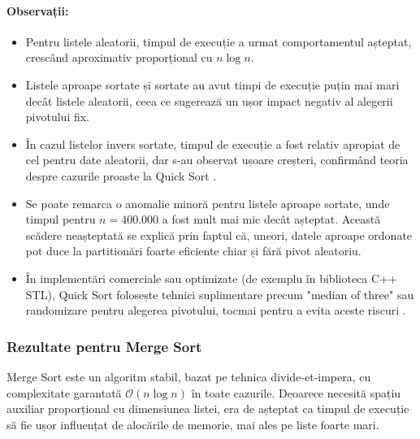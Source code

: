\documentclass{article}
\begin{document}
\paragraph*{Observații:}
\begin{itemize}
    \item Pentru listele aleatorii, timpul de execuție a urmat comportamentul așteptat, crescând aproximativ proporțional cu $n\log n$.
    \item Listele aproape sortate și sortate au avut timpi de execuție puțin mai mari decât listele aleatorii, ceea ce sugerează un ușor impact negativ al alegerii pivotului fix.
    \item În cazul listelor invers sortate, timpul de execuție a fost relativ apropiat de cel pentru date aleatorii, dar s-au observat ușoare creșteri, confirmând teoria despre cazurile proaste la Quick Sort \cite{bigocheatsheet}.
    \item Se poate remarca o anomalie minoră pentru listele aproape sortate, unde timpul pentru $n=400.000$ a fost mult mai mic decât așteptat. Această scădere neașteptată se explică prin faptul că, uneori, datele aproape ordonate pot duce la partitionări foarte eficiente chiar și fără pivot aleatoriu.
    \item În implementări comerciale sau optimizate (de exemplu în biblioteca C++ STL), Quick Sort folosește tehnici suplimentare precum "median of three" sau randomizare pentru alegerea pivotului, tocmai pentru a evita aceste riscuri \cite{cppreferenceqsort}.
\end{itemize}


\subsubsection{Rezultate pentru Merge Sort}

Merge Sort este un algoritm stabil, bazat pe tehnica divide-et-impera, cu complexitate garantată $\mathcal{O}(n\log n)$ în toate cazurile. Deoarece necesită spațiu auxiliar proporțional cu dimensiunea listei, era de așteptat ca timpul de execuție să fie ușor influențat de alocările de memorie, mai ales pe liste foarte mari.
\end{document}
